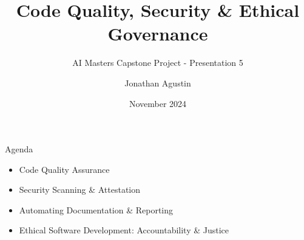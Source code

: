 \documentclass[aspectratio=169]{beamer}
\title{Code Quality, Security \& Ethical Governance}
\subtitle{AI Masters Capstone Project - Presentation 5}
\author{Jonathan Agustin}
\date{November 2024}
\begin{document}

\maketitle


\begin{frame}{Agenda}

\begin{itemize}
\item Code Quality Assurance
\item Security Scanning \& Attestation
\item Automating Documentation \& Reporting
\item Ethical Software Development: Accountability \& Justice
\end{itemize}
\end{frame}
\end{document}
